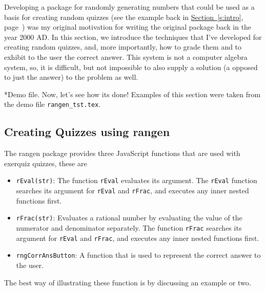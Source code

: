 \documentclass[12pt]{article}
\makeatletter
\let\pkg\textsf
\renewcommand{\paragraph}
    {\@startsection{paragraph}{4}{0pt}{6pt}{-3pt}{\bfseries}}
\makeatother
\begin{document}
Developing a package for randomly generating numbers that could be
used as a basis for creating random quizzes (see the example back in
\hyperref[s:intro]{Section~\ref*{s:intro}}, page~\pageref*{s:intro})
was my original motivation for writing the original package back in
the year 2000 AD. In this section, we introduce the techniques that
I've developed for creating random quizzes, and, more importantly,
how to grade them and to exhibit to the user the correct answer.
This system is not a computer algebra system, so, it is difficult,
but not impossible to also supply a solution (a opposed to just the
answer) to the problem as well.

\paragraph*{Demo file.}  Now, let's see how its done! Examples of this section were taken from the
demo file \texttt{rangen\_tst.tex}.

\subsection{Creating Quizzes using \textsf{rangen}}


The \pkg{rangen} package provides three JavaScript functions that are used with \textsf{exerquiz}
quizzes, these are
\begin{itemize}
    \item \texttt{rEval(str)}: The function \texttt{rEval} evaluates its
        argument. The \texttt{rEval} function searches its argument for
        \texttt{rEval} and \texttt{rFrac}, and executes any inner nested
        functions first.
    \item \texttt{rFrac(str)}: Evaluates a rational number by evaluating
        the value of the numerator and denominator separately. The function
        \texttt{rFrac} searches its argument for \texttt{rEval} and
        \texttt{rFrac}, and executes any inner nested functions first.
    \item \texttt{rngCorrAnsButton}: A function that is used to represent
        the correct answer to the user.
\end{itemize}
The best way of illustrating these function is by discussing an example or two.
\end{document}

